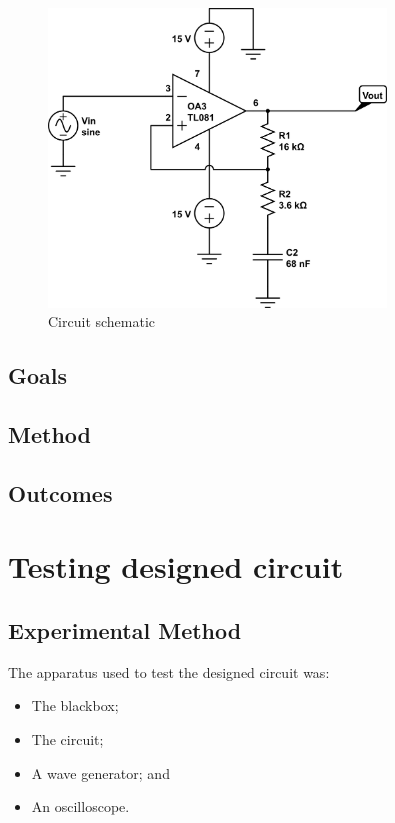 \documentclass[12pt]{article} %
\begin{document}
\begin{figure}
 	\centering
	\includegraphics[width=0.8\textwidth]{CircuitDiagram.png}
	\caption{Circuit schematic}
\end{figure}

\subsection{Goals}


\subsection{Method}


\subsection{Outcomes}
\pagebreak





\section{Testing designed circuit}

\subsection{Experimental Method}

The apparatus used to test the designed circuit was:
\begin{itemize} \itemsep1pt
	\item The blackbox;
	\item The circuit;
	\item A wave generator; and
	\item An oscilloscope.
\end{itemize}
\end{document}
